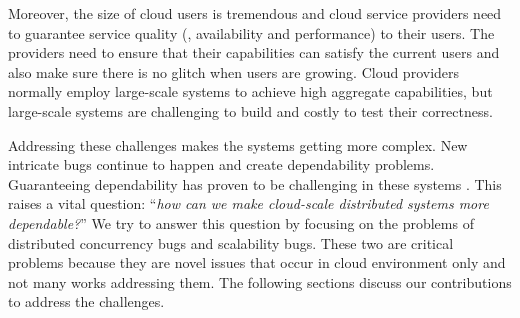 Moreover, the size of cloud users is tremendous and cloud service providers need
to guarantee service quality (\ie, availability and performance) to their users.
The providers need to ensure that their capabilities can satisfy the current
users and also make sure there is no glitch when users are growing. Cloud
providers normally employ large-scale systems to achieve high aggregate
capabilities, but large-scale systems are challenging to build and costly to
test their correctness.

Addressing these challenges makes the systems getting more complex. New
intricate bugs continue to happen and create dependability problems.
Guaranteeing dependability has proven to be challenging in these systems
\cite{Gunawi+11-FateDestini, Guo+11-Demeter, Liu+17-DCatch, Wang+14-Exalt,
Yang+09-Modist}.  This raises a vital question: ``{\em how can we make
cloud-scale distributed systems more dependable?}'' We try to answer this
question by focusing on the problems of distributed concurrency bugs and
scalability bugs.  These two are critical problems because they are novel issues
that occur in cloud environment only and not many works addressing them.  The
following sections discuss our contributions to address the challenges.

